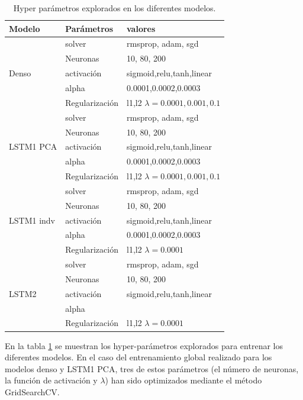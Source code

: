  \begin{table}[h!]
  \begin{center} 
  \begin{tabular}{|l|l|l|}
    \hline
   Modelo&Parámetros &  valores \\
   \hline
   &solver &  rmsprop, adam, sgd\\
   &Neuronas &  10, 80, 200 \\
   Denso &activación & sigmoid,relu,tanh,linear \\
   &alpha &  0.0001,0.0002,0.0003 \\
   &Regularización & l1,l2 $\lambda = 0.0001,0.001,0.1$  \\
   \hline
   &solver &   rmsprop, adam, sgd\\
   &Neuronas &  10, 80, 200 \\
   LSTM1 PCA &activación & sigmoid,relu,tanh,linear \\
   &alpha &  0.0001,0.0002,0.0003 \\
   &Regularización & l1,l2 $\lambda =0.0001,0.001,0.1$  \\

   \hline
   &solver &   rmsprop, adam, sgd\\
   &Neuronas &  10, 80, 200 \\
   LSTM1 indv &activación & sigmoid,relu,tanh,linear \\
   &alpha &  0.0001,0.0002,0.0003 \\
   &Regularización & l1,l2 $\lambda =0.0001$  \\

   \hline
   &solver &   rmsprop, adam, sgd\\
   &Neuronas &  10, 80, 200 \\
   LSTM2 &activación & sigmoid,relu,tanh,linear \\
   &alpha &  \\
   &Regularización & l1,l2 $\lambda =0.0001$  \\
   \hline

  \end{tabular}
  \caption{ Hyper parámetros explorados en los diferentes modelos.}
  \label{hyper}
\end{center}
  \end{table}


  En la tabla \ref{hyper} se muestran los hyper-parámetros explorados para entrenar los diferentes modelos. En el caso
  del entrenamiento global realizado para los modelos denso y LSTM1 PCA, tres de 
  estos parámetros (el número de neuronas, la función de activación y $\lambda$) 
  han sido optimizados mediante el método GridSearchCV.


